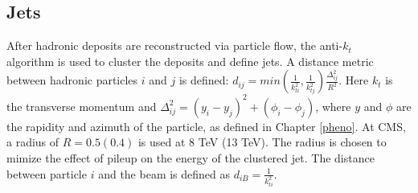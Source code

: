 \documentclass[oneside, letterpaper, oldfontcommands]{memoir}
\begin{document}
\subsection{Jets}\label{jets}
\qquad After hadronic deposits are reconstructed via particle flow, the anti-$k_{t}$ ~\cite{Cacciari:2008gp} algorithm is used to cluster the deposits and define jets. A distance metric between hadronic particles $i$ and $j$ is defined: $d_{ij} = min(\frac{1}{k_{ti}^{2}},\frac{1}{k_{tj}^{2}})\frac{\Delta_{ij}^{2}}{R^{2}}$. Here $k_{t}$ is the transverse momentum and $\Delta_{ij}^{2} = (y_{i}-y_{j})^{2} + (\phi_{i} - \phi_{j})$, where $y$ and $\phi$ are the rapidity and azimuth of the particle, as defined in Chapter \ref{pheno}. At CMS, a radius of $R = 0.5 (0.4)$ is used at 8 TeV (13 TeV). The radius is chosen to mimize the effect of pileup on the energy of the clustered jet. The distance between particle $i$ and the beam is defined as $d_{iB} = \frac{1}{k_{ti}^{2}}$.
\end{document}
